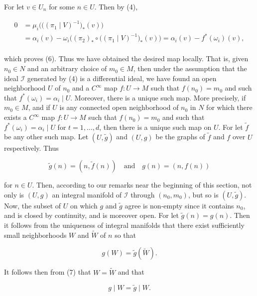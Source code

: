 For let  $ v \in U_{n} $ for some  $ n \in U $. Then by (4),

\[
\begin{aligned}{0}&{{}=\mu_{i}\big(\big((\pi_{1}\mid V)^{-1}\big)_{*}(v)\big)}\\ {}&{{}=\alpha_{i}(v)-\omega_{i}\big((\pi_{2})_{*}\circ \big((\pi_{1}\mid V)^{-1}\big)_{*}(v)\big)=\alpha_{i}(v)-f^{*}(\omega_{i})(v),}\\ \end{aligned}
\]

which proves (6). Thus we have obtained the desired map locally. That is, given $n_{0} \in N$ and an arbitrary choice of $m_{0} \in M$, then under the assumption that the ideal $\mathcal{I}$ generated by (4) is a differential ideal, we have found an open neighborhood $U$ of $n_{0}$ and a $C^{\infty}$ map $f: U \to M$ such that $f(n_{0}) = m_{0}$ and such that $f^{*}(\omega_{i}) = \alpha_{i} \mid U$. Moreover, there is a unique such map. More precisely, if $m_{0} \in M$, and if $U$ is any connected open neighborhood of $n_{0}$ in $N$ for which there exists a $C^{\infty}$ map $f: U \to M$ such that $f(n_{0}) = m_{0}$ and such that $f^{*}(\omega_{i}) = \alpha_{i} \mid U$ for $t = 1, \ldots, d$, then there is a unique such map on $U$. For let $\tilde{f}$ be any other such map. Let $(U, \tilde{g})$ and $(U, g)$ be the graphs of $\tilde{f}$ and $f$ over $U$ respectively. Thus

\begin{equation}
\tag{7}\label{eq:2.33:7}
\tilde{g}(n)=\left(n,\tilde{f}(n)\right)\quad\text{and}\quad g(n)=\left(n,f(n)\right)
\end{equation}

for $n \in U$. Then, according to our remarks near the beginning of this section, not only is $(U,g)$ an integral manifold of $\mathcal{I}$ through $(n_{0},m_{0})$, but so is $(U,\tilde{g})$. Now, the subset of $U$ on which $g$ and $\tilde{g}$ agree is non-empty since it contains $n_{0}$, and is closed by continuity, and is moreover open. For let $\tilde{g}(n) = g(n)$. Then it follows from the uniqueness of integral manifolds that there exist sufficiently small neighborhoods $W$ and $\tilde{W}$ of $n$ so that

\begin{equation}
\tag{8}\label{eq:2.33:8}
g(W)=\tilde{g}(\tilde{W}).
\end{equation}

It follows then from (7) that  $ W = \tilde{W} $ and that

\begin{equation}
\tag{9}\label{eq:2.33:9}
g\mid W=\tilde{g}\mid W.
\end{equation}

